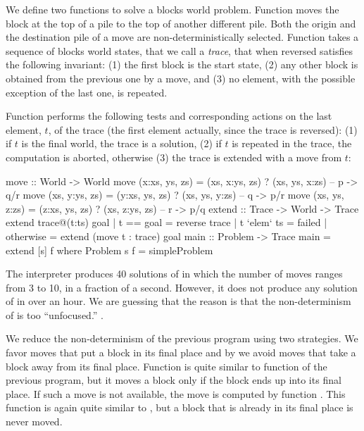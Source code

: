 %
We define two functions to solve a blocks world problem.
Function  moves the block at the top of a pile to
the top of another different pile.  Both the origin and the destination pile
of a move are non-deterministically selected.
Function  takes a sequence of blocks world states,
that we call a \emph{trace}, that when reversed satisfies the
following invariant: (1) the first block is the start state,
(2) any other block is obtained from the previous one by a move,
and (3) no element, with the possible exception of the last one,
is repeated.

Function  performs the following tests and corresponding
actions on the last element, $t$, of the trace (the first element actually,
since the trace is reversed):
(1) if $t$ is the final world, the trace is a solution,
(2) if $t$ is repeated in the trace, the computation is aborted,
otherwise (3) the trace is extended with a move from $t$:
%
\begin{prog}
move :: World -> World
move (x:xs, ys, zs) = (xs, x:ys, zs) ? (xs, ys, x:zs) -- p -> q/r
move (xs, y:ys, zs) = (y:xs, ys, zs) ? (xs, ys, y:zs) -- q -> p/r
move (xs, ys, z:zs) = (z:xs, ys, zs) ? (xs, z:ys, zs) -- r -> p/q
\medskip
extend :: Trace -> World -> Trace
extend trace@(t:ts) goal
  | t == goal    = reverse trace
  | t `elem` ts  = failed
  | otherwise    = extend (move t : trace) goal
\medskip
main :: Problem -> Trace
main = extend [s] f where Problem s f = simpleProblem
\end{prog}
%
The \pakcs{} interpreter produces 40 solutions of 
in which the number of moves ranges from 3 to 10, in a fraction of a second.
However, it does not produce any solution of  in
over an hour.  We are guessing that the reason is that the
non-determinism of  is too ``unfocused.''
.

We reduce the non-determinism of the previous program using
two strategies.  We favor moves that put a block in its final place and
by we avoid moves that take a block away from its final place.
Function  is quite similar to function 
of the previous program, but it moves a block only
if the block ends up into its final place.  If such a move is not available,
the move is computed by function .
This function is again quite similar to ,
but a block that is already in its final place is never moved.

